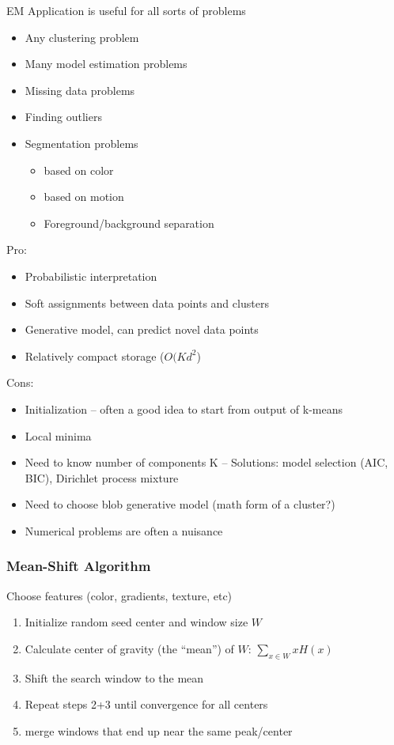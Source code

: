 EM Application is useful for all sorts of problems 
\begin{itemize}
	\item Any clustering problem
	\item Many model estimation problems
	\item Missing data problems
	\item Finding outliers
	\item Segmentation problems
	\begin{itemize}
		\item based on color
		\item based on motion
		\item Foreground/background separation 
\end{itemize}	
\end{itemize}
Pro:
\begin{itemize}
	\item Probabilistic interpretation
	\item Soft assignments between data points and clusters
	\item Generative model, can predict novel data points 
	\item Relatively compact storage ($O(Kd^2$)
\end{itemize}
Cons:
\begin{itemize}
	\item Initialization – often a good idea to start from output of k-means
	\item Local minima
	\item Need to know number of components K – Solutions: model selection (AIC, BIC), Dirichlet process mixture
	\item  Need to choose blob generative model (math form of a cluster?)
	\item Numerical problems are often a nuisance
\end{itemize}

\subsubsection{Mean-Shift Algorithm}
Choose features (color, gradients, texture, etc)
\begin{enumerate}
	\item Initialize random seed center and window size $W$
	\item Calculate center of gravity (the “mean”) of $W$: $ \sum_{x \in W} x H(x) $
	\item Shift the search window to the mean
	\item Repeat steps 2+3 until convergence for all centers
	\item merge windows that end up near the same peak/center
\end{enumerate}

